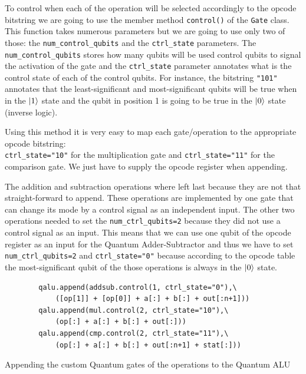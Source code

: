 To control when each of the operation will be selected accordingly to the opcode bitstring we are going to use the member
method \verb|control()| of the \verb|Gate| class. This function takes numerous parameters but we are going to use only
two of those: the \verb|num_control_qubits| and the \verb|ctrl_state| parameters. The \verb|num_control_qubits| stores
how many qubits will be used control qubits to signal the activation of the gate and the \verb|ctrl_state| parameter
annotates what is the control state of each of the control qubits. For instance, the bitstring \verb|"101"| annotates
that the least-significant and most-significant qubits will be true when in the $\ket{1}$ state and the qubit in position
1 is going to be true in the $\ket{0}$ state (inverse logic).

Using this method it is very easy to map each gate/operation to the appropriate opcode bitstring: \\\verb|ctrl_state="10"| for
the multiplication gate and \verb|ctrl_state="11"| for the comparison gate. We just have to supply the opcode register
when appending.

The addition and subtraction operations where left last because they are not that straight-forward to append. These operations are
implemented by one gate that can change its mode by a control signal as an independent input. The other two operations needed
to set the \verb|num_ctrl_qubits=2| because they did not use a control signal as an input. This means that we can use one qubit
of the opcode register as an input for the Quantum Adder-Subtractor and thus we have to set \verb|num_ctrl_qubits=2| and
\verb|ctrl_state="0"| because according to the opcode table the most-significant qubit of the those operations is always in the
$\ket{0}$ state.

\begin{listing}[ht]
    \begin{verbatim}
        qalu.append(addsub.control(1, ctrl_state="0"),\
            ([op[1]] + [op[0]] + a[:] + b[:] + out[:n+1]))
        qalu.append(mul.control(2, ctrl_state="10"),\
            (op[:] + a[:] + b[:] + out[:]))
        qalu.append(cmp.control(2, ctrl_state="11"),\
            (op[:] + a[:] + b[:] + out[:n+1] + stat[:]))
    \end{verbatim}
    \caption{Appending the custom Quantum gates of the operations to the Quantum ALU}
\end{listing}

